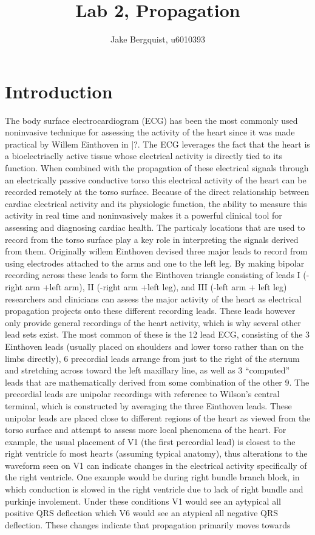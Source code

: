 \documentclass[12pt]{article}
\begin{document}
\title{Lab 2, Propagation}
\author{Jake Bergquist, u6010393}
\maketitle
\tableofcontents
\newpage

\section{Introduction}
The body surface electrocardiogram (ECG) has been the most commonly used noninvasive technique for assessing the activity of the heart since it was made practical by Willem Einthoven in |?. The ECG leverages the fact that the heart is a bioelectriaclly active tissue whose electrical activity is directly tied to its function. When combined with the propagation of these electrical signals through an electrically passive conductive torso this electrical activity of the heart can be recorded remotely at the torso surface. Because of the direct relationship between cardiac electrical activity and its physiologic function, the ability to measure this activity in real time and noninvasively makes it a powerful clinical tool for assessing and diagnosing cardiac health. The particaly locations that are used to record from the torso surface play a key role in interpreting the signals derived from them. Originally willem Einthoven devised three major leads to record from using electrodes attached to the arms and one to the left leg. By making bipolar recording across these leads to form the Einthoven triangle consisting of leads I (-right arm +left arm), II (-right arm +left leg), and III (-left arm + left leg) researchers and clinicians can assess the major activity of the heart as electrical propagation projects onto these different recording leads. These leads however only provide general recordings of the heart activity, which is why several other lead sets exist. The most common of these is the 12 lead ECG, consisting of the 3 Einthoven leads (usually placed on shoulders and lower torso rather than on the limbs directly), 6 precordial leads arrange from just to the right of the sternum and stretching across toward the left maxillary line, as well as 3 ``computed'' leads that are mathematically derived from some combination of the other 9. The precordial leads are unipolar recordings with reference to Wilson's central terminal, which is constructed by averaging the three Einthoven leads. These unipolar leads are placed close to different regions of the heart as viewed from the torso surface and attempt to assess more local phenomena of the heart. For example, the usual placement of V1 (the first percordial lead) is closest to the right ventricle fo most hearts (assuming typical anatomy), thus alterations to the waveform seen on V1 can indicate changes in the electrical activity specifically of the right ventricle. One example would be during right bundle branch block, in which conduction is slowed in the right ventricle due to lack of right bundle and purkinje involement. Under these conditions V1 would see an aytypical all positive QRS deflection which V6 would see an atypical all negative QRS deflection. These changes indicate that propagation primarily moves towards 
\end{document}
